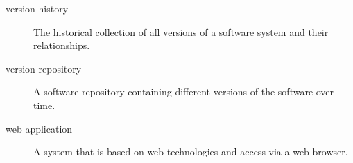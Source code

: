 \documentclass[11pt, oneside]{article}
\begin{document}
\begin{description}
\item[version history]
The historical collection of all versions of a software system and their relationships.

\item[version repository]
A software repository containing different versions of the software over time.


\item[web application]
A system that is based on web technologies and access via a web browser.

\end{description}



\end{document}
